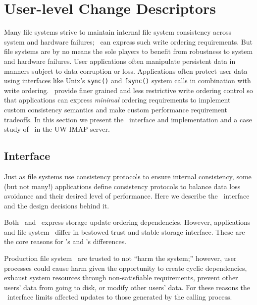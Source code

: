 \section{User-level Change Descriptors}
\label{sec:opgroup}

\newcommand{\opgroupCreate}{\texttt{opgroup\_create()}}
\newcommand{\opgroupSync}{\texttt{opgroup\_sync()}}
\newcommand{\opgroupAddDepend}{\texttt{opgroup\_add\_depend()}}
\newcommand{\opgroupEngage}{\texttt{opgroup\_engage()}}
\newcommand{\opgroupDisengage}{\texttt{opgroup\_disengage()}}
\newcommand{\opgroupRelease}{\texttt{opgroup\_release()}}
\newcommand{\opgroupAbandon}{\texttt{opgroup\_abandon()}}

Many file systems strive to maintain internal file system consistency
across system and hardware failures; \chdescs\ can express such write
ordering requirements. But file systems are by no means the sole
players to benefit from robustness to system and hardware failures.
User applications often manipulate persistent data in manners subject
to data corruption or loss. Applications often protect user data using
interfaces like Unix's \texttt{sync()} and \texttt{fsync()} system
calls in combination with write ordering. \Opgroups\ provide finer
grained and less restrictive write ordering control so that
applications can express \textit{minimal} ordering requirements to
implement custom consistency semantics and make custom performance
requirement tradeoffs. In this section we present the \opgroup\
interface and implementation and a case study of \opgroups\ in the
UW IMAP server.

\subsection{Interface}
\label{sec:opgroup:interface}
Just as file systems use consistency protocols to ensure internal
consistency, some (but not many!) applications define consistency
protocols to balance data loss avoidance and their desired level of
performance. Here we describe the \opgroup\ interface and the design
decisions behind it.

Both \opgroups\ and \chdescs\ express storage update ordering
dependencies. However, applications and file system \modules\ differ
in bestowed trust and stable storage interface. These are the core
reasons for \opgroup{}'s and \chdesc{}'s differences.

Production file system \modules\ are trusted to not ``harm the
system;'' however, user processes could cause harm given the
opportunity to create cyclic dependencies, exhaust system resources
through non-satisfiable requirements, prevent other users' data from
going to disk, or modify other users' data. For these reasons the
\opgroup\ interface limits affected updates to those generated by the
calling process.

